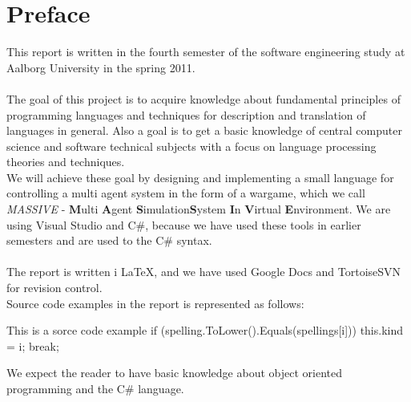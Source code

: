 \chapter*{Preface}
This report is written in the fourth semester of the software engineering study at Aalborg University in the spring 2011.
\\
\\
The goal of this project is to acquire knowledge about fundamental principles of programming languages and techniques for description and translation of languages in general. Also a goal is to get a basic knowledge of central computer science and software technical subjects with a focus on language processing theories and techniques.\\ \indent
  We will achieve these goal by designing and implementing a small language for controlling a multi agent system in the form of a wargame, which we call \textit{MASSIVE} - \textbf{M}ulti \textbf{A}gent \textbf{S}imulation\textbf{S}ystem \textbf{I}n \textbf{V}irtual \textbf{E}nvironment. We are using Visual Studio and C\#, because we have used these tools in earlier semesters and are used to the C\# syntax.
	\\
	\\
	The report is written i \LaTeX, and we have used Google Docs and TortoiseSVN for revision control.
	\\

Source code examples in the report is represented as follows:
\begin{source}{This is a sorce code example}{}
if (spelling.ToLower().Equals(spellings[i]))
	{
		this.kind = i;
		break;
	}
\end{source}

We expect the reader to have basic knowledge about object oriented programming and the C\# language.